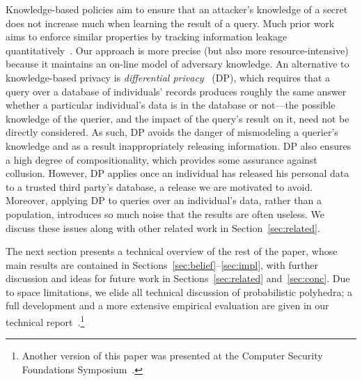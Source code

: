 Knowledge-based policies aim to ensure that an attacker's knowledge of a secret does not
increase much when learning the result of a query.  Much prior work
aims to enforce similar properties by tracking information
leakage quantitatively~\cite{McCamantE2008, smith09foundations,
  backes09automatic, kopf:rybalchenko, rastogi09relationship}. Our
approach is more 
precise (but also more resource-intensive) because it maintains an on-line model
of adversary knowledge.  An alternative to knowledge-based
privacy is \emph{differential privacy}~\cite{diffpriv} (DP), which requires
that a query over a database of individuals' records produces roughly
the same answer whether a particular individual's data is in the
database or not---the possible knowledge of the querier, and the
impact of the query's result on it, need not be directly considered.
As such, DP avoids the danger of mismodeling a querier's knowledge
and as a result inappropriately releasing information.  DP also ensures
a high degree of compositionality, which provides some assurance
against collusion.  However, DP applies once an individual has
released his personal data to a trusted third party's database, a
release we are motivated to avoid. Moreover, applying DP to queries
over an individual's data, rather than a population, introduces so much
noise that the results are often useless.  We discuss these
issues along with other related work in Section~\ref{sec:related}.

The next section presents a technical overview of the rest of the
paper, whose main results are contained in
Sections~\ref{sec:belief}--\ref{sec:impl}, with further discussion and
ideas for future work in Sections~\ref{sec:related}
and~\ref{sec:conc}.  \ifacita Due to space limitations, we elide all
technical discussion of probabilistic polyhedra; a full development
and a more extensive empirical evaluation are given in our technical
report~\cite{TR}.\footnote{Another version of
this paper was presented at the Computer Security Foundations
Symposium~\cite{mardziel11belief}.}   \fi



